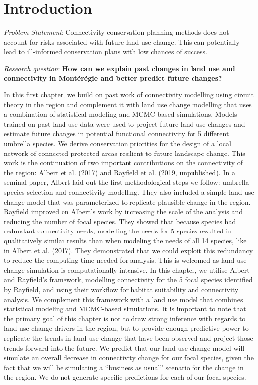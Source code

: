 \section{Introduction}
\textit{Problem Statement}: Connectivity conservation planning methods does not account for risks associated with future land use change. This can potentially lead to ill-informed conservation plans with low chances of success.

\textit{Research question}: \textbf{How can we explain past changes in land use and connectivity in Montérégie and better predict future changes?}

In this first chapter, we build on past work of connectivity modelling using circuit theory in the region and complement it with land use change modelling that uses a combination of statistical modeling and MCMC-based simulations. Models trained on past land use data were used to project future land use changes and estimate future changes in potential functional connectivity for 5 different umbrella species. We derive conservation priorities for the design of a local network of connected protected areas resilient to future landscape change.
This work is the continuation of two important contributions on the connectivity of the region: Albert et al. (2017) and Rayfield et al. (2019, unpublished). In a seminal paper, Albert laid out the first methodological steps we follow: umbrella species selection and connectivity modelling. They also included a simple land use change model that was parameterized to replicate plausible change in the region. Rayfield improved on Albert’s work by increasing the scale of the analysis and reducing the number of focal species. They showed that because species had redundant connectivity needs, modelling the needs for 5 species resulted in qualitatively similar results than when modeling the needs of all 14 species, like in Albert et al. (2017). They demonstrated that we could exploit this redundancy to reduce the computing time needed for analysis. This is welcomed as land use change simulation is computationally intensive.
In this chapter, we utilise Albert and Rayfield’s framework, modelling connectivity for the 5 focal species identified by Rayfield, and using their workflow for habitat suitability and connectivity analysis. We complement this framework with a land use model that combines statistical modeling and MCMC-based simulations. It is important to note that the primary goal of this chapter is not to draw strong inference with regards to land use change drivers in the region, but to provide enough predictive power to replicate the trends in land use change that have been observed and project those trends forward into the future.
We predict that our land use change model will simulate an overall decrease in connectivity change for our focal species, given the fact that we will be simulating a “business as usual” scenario for the change in the region. We do not generate specific predictions for each of our focal species.
\\
